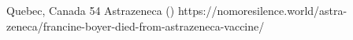           {Quebec, Canada}
          {54}
          {Astrazeneca}
          {}
          {
             ()
          }
          {https://nomoresilence.world/astra-zeneca/francine-boyer-died-from-astrazeneca-vaccine/}

